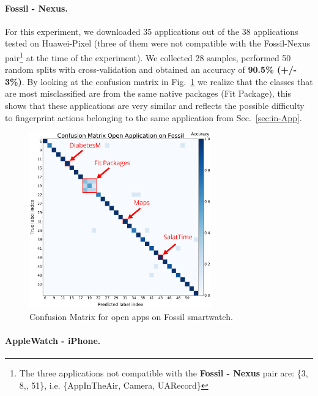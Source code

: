 \paragraph{\textbf{Fossil - Nexus}.} For this experiment, we downloaded 35 applications out of the 38 applications tested on Huawei-Pixel (three of them were not compatible with the Fossil-Nexus pair\footnote{The three applications not compatible with the \textbf{Fossil - Nexus} pair are: \{3, 8,, 51\}, i.e. \{AppInTheAir, Camera, UARecord\}} at the time of the experiment). We collected 28 samples, performed 50 random splits with cross-validation and obtained an accuracy of \textbf{90.5\% (+/- 3\%)}. By looking at the confusion matrix in Fig.~\ref{fig:cm_fossil} we realize that the classes that are most misclassified are from the same native packages (Fit Package), this shows that these applications are very similar and reflects the possible difficulty to fingerprint actions belonging to the same application from Sec.~\ref{sec:in-App}. 


\begin{figure}[ht]
 \centering
 \includegraphics[width=0.70\textwidth]{figures/cm/Confusion_matrix_for_fossill_annoted.png}
 
 \caption{Confusion Matrix for open apps on Fossil smartwatch.}
 \label{fig:cm_fossil}
\end{figure}


\paragraph{\textbf{AppleWatch - iPhone.}}

